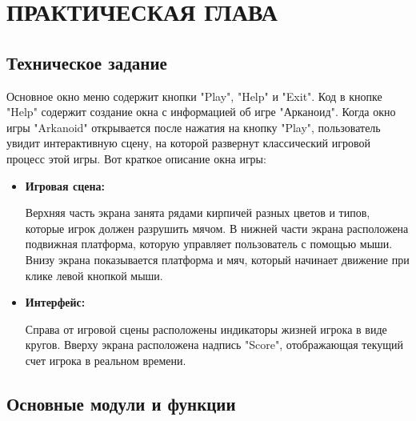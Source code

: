 \chapter{\label{ch:ch02}ПРАКТИЧЕСКАЯ ГЛАВА}

\section{\label{sec:ch02/sec01}Техническое задание}
Основное окно меню содержит кнопки "Play", "Help" и "Exit". Код в кнопке "Help" содержит создание окна с информацией об игре "Арканоид". Когда окно игры "Arkanoid" открывается после нажатия на кнопку "Play", пользователь увидит интерактивную сцену, на которой развернут классический игровой процесс этой игры. Вот краткое описание окна игры:
\begin{itemize}
    \item \textbf{Игровая сцена:}
    
        Верхняя часть экрана занята рядами кирпичей разных цветов и типов, которые игрок должен разрушить мячом. В нижней части экрана расположена подвижная платформа, которую управляет пользователь с помощью мыши. Внизу экрана показывается платформа и мяч, который начинает движение при клике левой кнопкой мыши.

    \item \textbf{Интерфейс:}
    
        Справа от игровой сцены расположены индикаторы жизней игрока в виде кругов. Вверху экрана расположена надпись "Score", отображающая текущий счет игрока в реальном времени. 
\end{itemize}
\section{\label{sec:ch02/sec02}Основные модули и функции}

